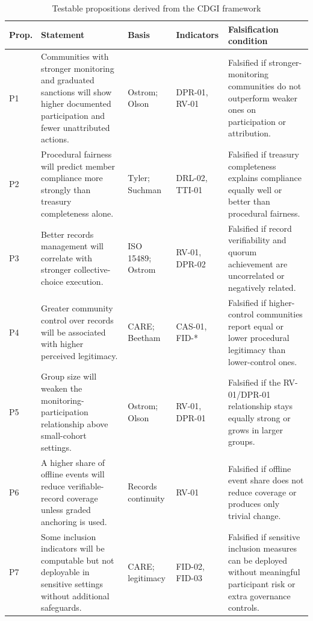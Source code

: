 \documentclass[sigconf]{acmart}
\begin{document}
\begin{table}[t]
\caption{Testable propositions derived from the CDGI framework}
\label{tab:props}
\small
\begin{tabularx}{\textwidth}{>{\raggedright\arraybackslash}p{0.55cm} >{\raggedright\arraybackslash}p{4.8cm} >{\raggedright\arraybackslash}p{2.1cm} >{\raggedright\arraybackslash}p{1.7cm} Y}
\toprule
Prop. & Statement & Basis & Indicators & Falsification condition \\
\midrule
P1 & Communities with stronger monitoring and graduated sanctions will show higher documented participation and fewer unattributed actions. & Ostrom; Olson & DPR-01, RV-01 & Falsified if stronger-monitoring communities do not outperform weaker ones on participation or attribution. \\
P2 & Procedural fairness will predict member compliance more strongly than treasury completeness alone. & Tyler; Suchman & DRL-02, TTI-01 & Falsified if treasury completeness explains compliance equally well or better than procedural fairness. \\
P3 & Better records management will correlate with stronger collective-choice execution. & ISO 15489; Ostrom & RV-01, DPR-02 & Falsified if record verifiability and quorum achievement are uncorrelated or negatively related. \\
P4 & Greater community control over records will be associated with higher perceived legitimacy. & CARE; Beetham & CAS-01, FID-* & Falsified if higher-control communities report equal or lower procedural legitimacy than lower-control ones. \\
P5 & Group size will weaken the monitoring-participation relationship above small-cohort settings. & Ostrom; Olson & RV-01, DPR-01 & Falsified if the RV-01/DPR-01 relationship stays equally strong or grows in larger groups. \\
P6 & A higher share of offline events will reduce verifiable-record coverage unless graded anchoring is used. & Records continuity & RV-01 & Falsified if offline event share does not reduce coverage or produces only trivial change. \\
P7 & Some inclusion indicators will be computable but not deployable in sensitive settings without additional safeguards. & CARE; legitimacy & FID-02, FID-03 & Falsified if sensitive inclusion measures can be deployed without meaningful participant risk or extra governance controls. \\
\bottomrule
\end{tabularx}
\end{table}
\end{document}
